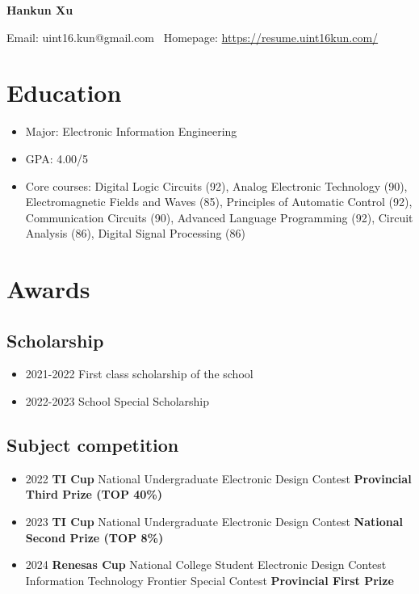 \documentclass{article}
\begin{document}
\begin{center}
    \textbf{\Large Hankun Xu}
\end{center}

\begin{center}
    Email: uint16.kun@gmail.com \textbar \  Homepage: \href{https://resume.uint16kun.com/}{https://resume.uint16kun.com/}
\end{center}

\section*{Education}
\begin{itemize}
    \item Major: Electronic Information Engineering
    \item GPA: 4.00/5
    \item Core courses: Digital Logic Circuits (92), Analog Electronic Technology (90), Electromagnetic Fields and Waves (85), Principles of Automatic Control (92), Communication Circuits (90), Advanced Language Programming (92), Circuit Analysis (86), Digital Signal Processing (86)
\end{itemize}

\section*{Awards}
\subsection*{Scholarship}
\begin{itemize}
    \item 2021-2022 First class scholarship of the school
    \item 2022-2023 School Special Scholarship
\end{itemize}

\subsection*{Subject competition}
\begin{itemize}
    \item 2022 \textbf{TI Cup} National Undergraduate Electronic Design Contest \textbf{Provincial Third Prize (TOP 40\%)}
    \item 2023 \textbf{TI Cup} National Undergraduate Electronic Design Contest \textbf{National Second Prize (TOP 8\%)}
    \item 2024 \textbf{Renesas Cup} National College Student Electronic Design Contest Information Technology Frontier Special Contest \textbf{Provincial First Prize}
\end{itemize}
\end{document}
